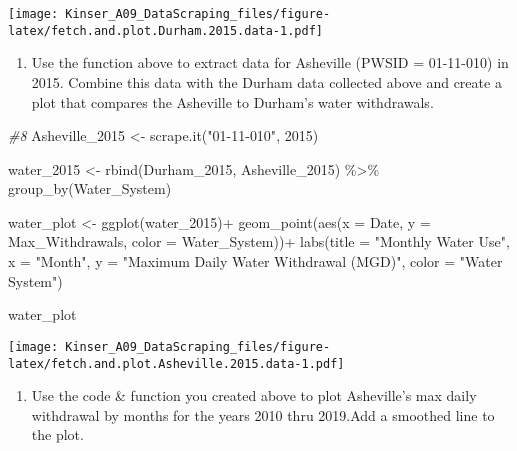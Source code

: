 \documentclass[
]{article}
\newenvironment{Shaded}{\begin{snugshade}}{\end{snugshade}}
\newcommand{\AttributeTok}[1]{\textcolor[rgb]{0.77,0.63,0.00}{#1}}
\newcommand{\CommentTok}[1]{\textcolor[rgb]{0.56,0.35,0.01}{\textit{#1}}}
\newcommand{\DecValTok}[1]{\textcolor[rgb]{0.00,0.00,0.81}{#1}}
\newcommand{\FunctionTok}[1]{\textcolor[rgb]{0.00,0.00,0.00}{#1}}
\newcommand{\NormalTok}[1]{#1}
\newcommand{\OtherTok}[1]{\textcolor[rgb]{0.56,0.35,0.01}{#1}}
\newcommand{\SpecialCharTok}[1]{\textcolor[rgb]{0.00,0.00,0.00}{#1}}
\newcommand{\StringTok}[1]{\textcolor[rgb]{0.31,0.60,0.02}{#1}}
\providecommand{\tightlist}{%
  \setlength{\itemsep}{0pt}\setlength{\parskip}{0pt}}
\begin{document}
\texttt{[image: Kinser\_A09\_DataScraping\_files/figure-latex/fetch.and.plot.Durham.2015.data-1.pdf]}

\begin{enumerate}
\def\labelenumi{\arabic{enumi}.}
\setcounter{enumi}{7}
\tightlist
\item
  Use the function above to extract data for Asheville (PWSID =
  01-11-010) in 2015. Combine this data with the Durham data collected
  above and create a plot that compares the Asheville to Durham's water
  withdrawals.
\end{enumerate}

\begin{Shaded}
\begin{Highlighting}[]
\CommentTok{\#8}
\NormalTok{Asheville\_2015 }\OtherTok{\textless{}{-}} \FunctionTok{scrape.it}\NormalTok{(}\StringTok{"01{-}11{-}010"}\NormalTok{, }\DecValTok{2015}\NormalTok{)}

\NormalTok{water\_2015 }\OtherTok{\textless{}{-}} \FunctionTok{rbind}\NormalTok{(Durham\_2015, Asheville\_2015) }\SpecialCharTok{\%\textgreater{}\%}
  \FunctionTok{group\_by}\NormalTok{(Water\_System)}

\NormalTok{water\_plot }\OtherTok{\textless{}{-}} \FunctionTok{ggplot}\NormalTok{(water\_2015)}\SpecialCharTok{+}
  \FunctionTok{geom\_point}\NormalTok{(}\FunctionTok{aes}\NormalTok{(}\AttributeTok{x =}\NormalTok{ Date, }\AttributeTok{y =}\NormalTok{ Max\_Withdrawals, }\AttributeTok{color =}\NormalTok{ Water\_System))}\SpecialCharTok{+}
  \FunctionTok{labs}\NormalTok{(}\AttributeTok{title =} \StringTok{"Monthly Water Use"}\NormalTok{, }\AttributeTok{x =} \StringTok{"Month"}\NormalTok{, }\AttributeTok{y =} \StringTok{"Maximum Daily Water Withdrawal (MGD)"}\NormalTok{, }\AttributeTok{color =} \StringTok{"Water System"}\NormalTok{)}

\NormalTok{water\_plot}
\end{Highlighting}
\end{Shaded}

\texttt{[image: Kinser\_A09\_DataScraping\_files/figure-latex/fetch.and.plot.Asheville.2015.data-1.pdf]}

\begin{enumerate}
\def\labelenumi{\arabic{enumi}.}
\setcounter{enumi}{8}
\tightlist
\item
  Use the code \& function you created above to plot Asheville's max
  daily withdrawal by months for the years 2010 thru 2019.Add a smoothed
  line to the plot.
\end{enumerate}
\end{document}
